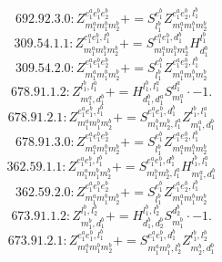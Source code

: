 \documentclass[letterpaper,10pt,fleqn,leqno,onecolumn]{article}
\begin{document}
\begin{equation} \;\;\;\;\;\;  692.92.3.0: Z^{e_{1}^{a}e_{1}^{b}e_{2}^{b}}_{m_{1}^{a}m_{1}^{b}m_{2}^{b}}+=S^{e_{1}^{b}}_{l_{1}^{b}}Z^{e_{1}^{a}e_{2}^{b},l_{1}^{b}}_{m_{1}^{a}m_{1}^{b}m_{2}^{b}} \end{equation}
\begin{equation} \;\;\;\;\;\;  309.54.1.1: Z^{e_{1}^{a}e_{1}^{b},l_{1}^{b}}_{m_{1}^{a}m_{1}^{b}m_{2}^{b}}+=S^{e_{1}^{a}e_{1}^{b},d_{1}^{b}}_{m_{1}^{a}m_{1}^{b}m_{2}^{b}}H^{l_{1}^{b}}_{d_{1}^{b}} \end{equation}
\begin{equation} \;\;\;\;\;\;  309.54.2.0: Z^{e_{1}^{a}e_{1}^{b}e_{2}^{b}}_{m_{1}^{a}m_{1}^{b}m_{2}^{b}}+=S^{e_{1}^{b}}_{l_{1}^{b}}Z^{e_{1}^{a}e_{2}^{b},l_{1}^{b}}_{m_{1}^{a}m_{1}^{b}m_{2}^{b}} \end{equation}
\begin{equation} \;\;\;\;\;\;  678.91.1.2: Z^{l_{1}^{b},l_{1}^{a}}_{m_{1}^{a},d_{1}^{b}}+=H^{l_{1}^{b},l_{1}^{a}}_{d_{1}^{b},d_{1}^{a}}S^{d_{1}^{a}}_{m_{1}^{a}}\cdot -1. \end{equation}
\begin{equation} \;\;\;\;\;\;  678.91.2.1: Z^{e_{1}^{a}e_{1}^{b},l_{1}^{b}}_{m_{1}^{a}m_{1}^{b}m_{2}^{b}}+=S^{e_{1}^{a}e_{1}^{b},d_{1}^{b}}_{m_{1}^{b}m_{2}^{b},l_{1}^{a}}Z^{l_{1}^{b},l_{1}^{a}}_{m_{1}^{a},d_{1}^{b}} \end{equation}
\begin{equation} \;\;\;\;\;\;  678.91.3.0: Z^{e_{1}^{a}e_{1}^{b}e_{2}^{b}}_{m_{1}^{a}m_{1}^{b}m_{2}^{b}}+=S^{e_{1}^{b}}_{l_{1}^{b}}Z^{e_{1}^{a}e_{2}^{b},l_{1}^{b}}_{m_{1}^{a}m_{1}^{b}m_{2}^{b}} \end{equation}
\begin{equation} \;\;\;\;\;\;  362.59.1.1: Z^{e_{1}^{a}e_{1}^{b},l_{1}^{b}}_{m_{1}^{a}m_{1}^{b}m_{2}^{b}}+=S^{e_{1}^{a}e_{1}^{b},d_{1}^{b}}_{m_{1}^{b}m_{2}^{b},l_{1}^{a}}H^{l_{1}^{b},l_{1}^{a}}_{m_{1}^{a},d_{1}^{b}} \end{equation}
\begin{equation} \;\;\;\;\;\;  362.59.2.0: Z^{e_{1}^{a}e_{1}^{b}e_{2}^{b}}_{m_{1}^{a}m_{1}^{b}m_{2}^{b}}+=S^{e_{1}^{b}}_{l_{1}^{b}}Z^{e_{1}^{a}e_{2}^{b},l_{1}^{b}}_{m_{1}^{a}m_{1}^{b}m_{2}^{b}} \end{equation}
\begin{equation} \;\;\;\;\;\;  673.91.1.2: Z^{l_{1}^{b},l_{2}^{b}}_{m_{1}^{b},d_{1}^{b}}+=H^{l_{1}^{b},l_{2}^{b}}_{d_{1}^{b},d_{2}^{b}}S^{d_{2}^{b}}_{m_{1}^{b}}\cdot -1. \end{equation}
\begin{equation} \;\;\;\;\;\;  673.91.2.1: Z^{e_{1}^{a}e_{1}^{b},l_{1}^{b}}_{m_{1}^{a}m_{1}^{b}m_{2}^{b}}+=S^{e_{1}^{a}e_{1}^{b},d_{1}^{b}}_{m_{1}^{a}m_{1}^{b},l_{2}^{b}}Z^{l_{1}^{b},l_{2}^{b}}_{m_{2}^{b},d_{1}^{b}} \end{equation}
\end{document}
